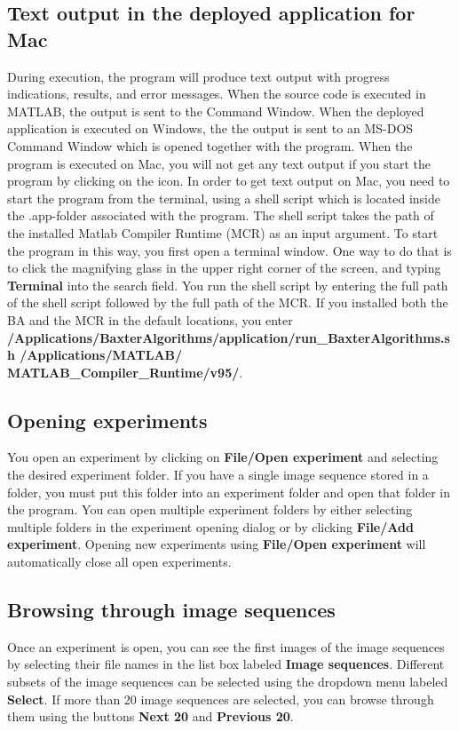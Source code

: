 \documentclass[a4paper, oneside, onecolumn, 11pt]{article}
\newcommand{\menu}[1]{\textbf{#1}}
\newcommand{\command}[1]{\textbf{#1}}
\newcommand{\control}[1]{\textbf{#1}}
\begin{document}
\subsection{Text output in the deployed application for Mac}
\label{sec:mac-terminal}
During execution, the program will produce text output with progress indications, results, and error messages. When the source code is executed in MATLAB, the output is sent to the Command Window. When the deployed application is executed on Windows, the the output is sent to an MS-DOS Command Window which is opened together with the program. When the program is executed on Mac, you will not get any text output if you start the program by clicking on the icon. In order to get text output on Mac, you need to start the program from the terminal, using a shell script which is located inside the .app-folder associated with the program. The shell script takes the path of the installed Matlab Compiler Runtime (MCR) as an input argument. To start the program in this way, you first open a terminal window. One way to do that is to click the magnifying glass in the upper right corner of the screen, and typing \command{Terminal} into the search field. You run the shell script by entering the full path of the shell script followed by the full path of the MCR. If you installed both the BA and the MCR in the default locations, you enter \command{/\mbox{Applications}/\allowbreak BaxterAlgorithms/\allowbreak \mbox{application}/\allowbreak run\_BaxterAlgorithms.sh \allowbreak/\mbox{Applications}/\allowbreak MATLAB/\allowbreak\\ MATLAB\_Compiler\_Runtime/\allowbreak v95/}.

\subsection{Opening experiments}
You open an experiment by clicking on \menu{File/\allowbreak Open experiment} and selecting the desired experiment folder. If you have a single image sequence stored in a folder, you must put this folder into an experiment folder and open that folder in the program. You can open multiple experiment folders by either selecting multiple folders in the experiment opening dialog or by clicking \menu{File/\allowbreak Add experiment}. Opening new experiments using \menu{File/\allowbreak Open experiment} will automatically close all open experiments.

\subsection{Browsing through image sequences}
Once an experiment is open, you can see the first images of the image sequences by selecting their file names in the list box labeled \control{Image sequences}. Different subsets of the image sequences can be selected using the dropdown menu labeled \control{Select}. If more than 20 image sequences are selected, you can browse through them using the buttons \control{Next 20} and \control{Previous 20}.
\end{document}
